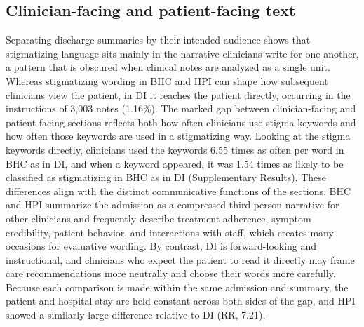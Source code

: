 \documentclass[unnumsec,webpdf,contemporary,large]{oup-authoring-template}
\begin{document}
\subsection{Clinician-facing and patient-facing text}
Separating discharge summaries by their intended audience shows that stigmatizing language sits mainly in the narrative clinicians write for one another, a pattern that is obscured when clinical notes are analyzed as a single unit.\cite{himmelstein2022,harrigian2023,xue2026,walker2025,scroggins2025} Whereas stigmatizing wording in BHC and HPI can shape how subsequent clinicians view the patient,\cite{goddu2018} in DI it reaches the patient directly, occurring in the instructions of 3,003 notes (1.16\%).
The marked gap between clinician-facing and patient-facing sections reflects both how often clinicians use stigma keywords and how often those keywords are used in a stigmatizing way. Looking at the stigma keywords directly, clinicians used the keywords 6.55 times as often per word in BHC as in DI, and when a keyword appeared, it was 1.54 times as likely to be classified as stigmatizing in BHC as in DI (Supplementary Results). These differences align with the distinct communicative functions of the sections. BHC and HPI summarize the admission as a compressed third-person narrative for other clinicians and frequently describe treatment adherence, symptom credibility, patient behavior, and interactions with staff, which creates many occasions for evaluative wording. By contrast, DI is forward-looking and instructional, and clinicians who expect the patient to read it directly may frame care recommendations more neutrally and choose their words more carefully. Because each comparison is made within the same admission and summary, the patient and hospital stay are held constant across both sides of the gap, and HPI showed a similarly large difference relative to DI (RR, 7.21).
\end{document}
